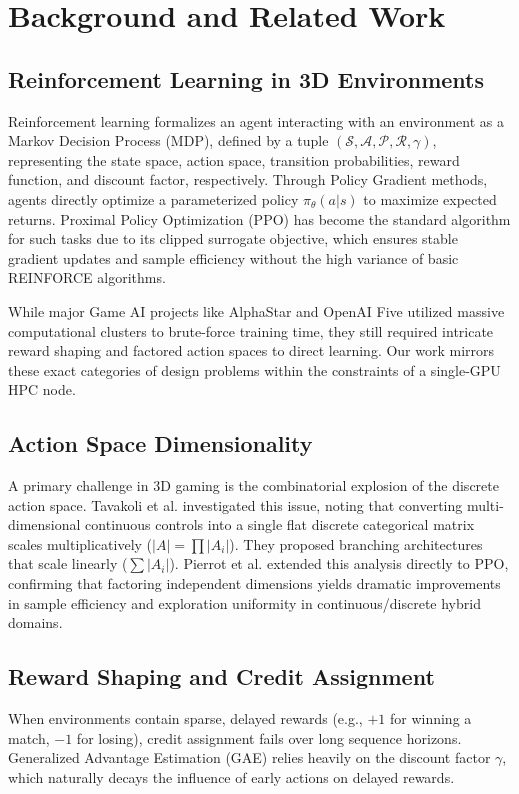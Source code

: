 \documentclass[conference]{IEEEtran}
\begin{document}
\section{Background and Related Work}

\subsection{Reinforcement Learning in 3D Environments}
Reinforcement learning formalizes an agent interacting with an environment as a Markov Decision Process (MDP), defined by a tuple $(\mathcal{S}, \mathcal{A}, \mathcal{P}, \mathcal{R}, \gamma)$, representing the state space, action space, transition probabilities, reward function, and discount factor, respectively. Through Policy Gradient methods, agents directly optimize a parameterized policy $\pi_\theta(a|s)$ to maximize expected returns. Proximal Policy Optimization (PPO) \cite{schulman2017proximal} has become the standard algorithm for such tasks due to its clipped surrogate objective, which ensures stable gradient updates and sample efficiency without the high variance of basic REINFORCE algorithms.

While major Game AI projects like AlphaStar and OpenAI Five \cite{berner2019dota} utilized massive computational clusters to brute-force training time, they still required intricate reward shaping and factored action spaces to direct learning. Our work mirrors these exact categories of design problems within the constraints of a single-GPU HPC node.

\subsection{Action Space Dimensionality}
A primary challenge in 3D gaming is the combinatorial explosion of the discrete action space. Tavakoli et al. \cite{tavakoli2018action} investigated this issue, noting that converting multi-dimensional continuous controls into a single flat discrete categorical matrix scales multiplicatively ($|A| = \prod |A_i|$). They proposed branching architectures that scale linearly ($\sum |A_i|$). Pierrot et al. \cite{pierrot2021factored} extended this analysis directly to PPO, confirming that factoring independent dimensions yields dramatic improvements in sample efficiency and exploration uniformity in continuous/discrete hybrid domains.

\subsection{Reward Shaping and Credit Assignment}
When environments contain sparse, delayed rewards (e.g., $+1$ for winning a match, $-1$ for losing), credit assignment fails over long sequence horizons. Generalized Advantage Estimation (GAE) \cite{schulman2016high} relies heavily on the discount factor $\gamma$, which naturally decays the influence of early actions on delayed rewards. 
\end{document}
